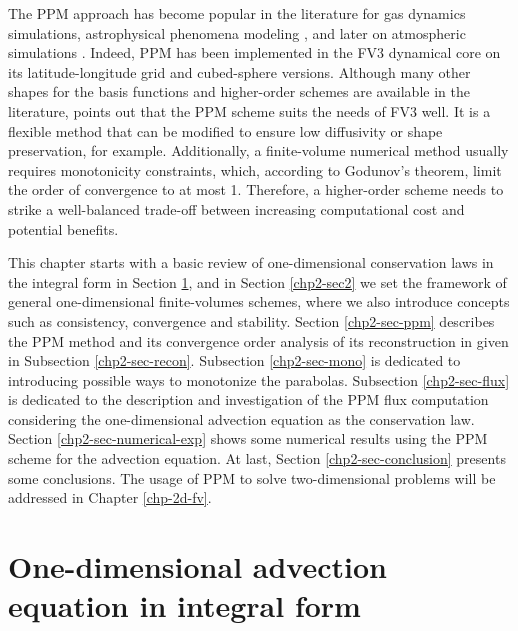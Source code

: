 The PPM approach has become popular in the literature for gas dynamics simulations, astrophysical 
phenomena modeling \citep{woodward:1986}, and later on atmospheric simulations \citep{carpenter:1990}. 
Indeed, PPM has been implemented in the FV3 dynamical core on its latitude-longitude grid \citep{lin:2004}
and cubed-sphere \citep{putman:2007} versions.
Although many other shapes for the basis functions and higher-order schemes are available in the literature, 
\citet{harris:2021} points out that the PPM scheme suits the needs of FV3 well. It is a flexible method that
 can be modified to ensure low diffusivity or shape preservation, for example.
Additionally, a finite-volume numerical method usually requires monotonicity constraints, which, according 
to Godunov's theorem, limit the order of convergence to at most 1. 
Therefore, a higher-order scheme needs to strike a well-balanced trade-off between increasing computational 
cost and potential benefits.

This chapter starts with a basic review of one-dimensional conservation laws in
the integral form in Section \ref{chp2-sec1}, and in Section \ref{chp2-sec2} 
we set the framework of general one-dimensional finite-volumes schemes,
where we also introduce concepts such as consistency, convergence and stability.
Section \ref{chp2-sec-ppm} describes the PPM method and its convergence order analysis
of its reconstruction in given in Subsection \ref{chp2-sec-recon}.
Subsection \ref{chp2-sec-mono} is dedicated to introducing possible ways to monotonize
the parabolas.
Subsection \ref{chp2-sec-flux} is dedicated to the description and investigation of the PPM flux
computation considering the one-dimensional advection equation as the conservation law.
Section \ref{chp2-sec-numerical-exp} shows some numerical results using the PPM scheme
for the advection equation.  At last, Section \ref{chp2-sec-conclusion} presents
some conclusions.
The usage of PPM to solve two-dimensional problems
will be addressed in Chapter \ref{chp-2d-fv}.

\section{One-dimensional advection equation in integral form}
\label{chp2-sec1}
